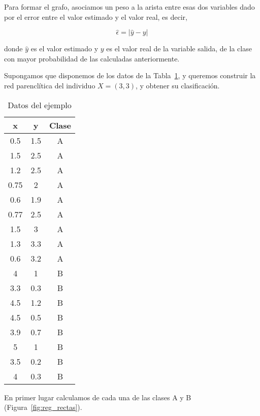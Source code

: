 Para formar el grafo, asociamos un peso a la arista entre esas dos variables dado por el error entre el valor estimado y el valor real, es decir,

\begin{equation}
\hat{\epsilon} = |\hat{y} - y|
\end{equation} 

donde $\hat{y}$ es el valor estimado y $y$ es el valor real de la variable salida, de la clase con mayor probabilidad de las calculadas anteriormente.\\

\begin{ejemplo}
	Supongamos que disponemos de los datos de la Tabla~\ref{tbl:ejemploredparenclitica}, y queremos construir la red parenclítica del individuo $X = (3,3)$, y obtener su clasificación.\\
	
	\begin{table}[htbp!]
		\centering
		\caption{Datos del ejemplo}
		\label{tbl:ejemploredparenclitica}
		\begin{tabular}{@{}ccc@{}}
			\toprule
			x    & y   & Clase \\ \midrule
			0.5  & 1.5 & A     \\
			1.5  & 2.5 & A     \\
			1.2  & 2.5 & A     \\
			0.75 & 2   & A     \\
			0.6  & 1.9 & A     \\
			0.77 & 2.5 & A     \\
			1.5  & 3   & A     \\
			1.3  & 3.3 & A     \\
			0.6  & 3.2 & A     \\
			4    & 1   & B     \\
			3.3  & 0.3 & B     \\
			4.5  & 1.2 & B     \\
			4.5  & 0.5 & B     \\
			3.9  & 0.7 & B     \\
			5    & 1   & B     \\
			3.5  & 0.2 & B     \\
			4    & 0.3 & B     \\ \bottomrule
		\end{tabular}
	\end{table}
	
	En primer lugar calculamos de cada una de las clases A y B (Figura~\ref{fig:reg_rectas}).\\
	

\end{ejemplo}

